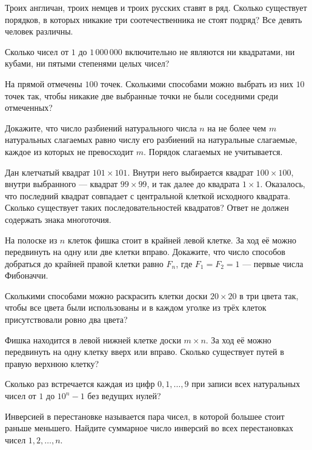 \begin{problems}
\item Троих англичан, троих немцев и троих русских ставят в ряд. Сколько существует порядков, в которых никакие три соотечественника не стоят подряд? Все девять человек различны.

\item Сколько чисел от $1$ до $1\,000\,000$ включительно не являются ни квадратами, ни кубами, ни пятыми степенями целых чисел?

\item На прямой отмечены $100$ точек. Сколькими способами можно выбрать из них $10$ точек так, чтобы никакие две выбранные точки не были соседними среди отмеченных?

\item Докажите, что число разбиений натурального числа $n$ на не более чем $m$ натуральных слагаемых равно числу его разбиений на натуральные слагаемые, каждое из которых не превосходит $m$. Порядок слагаемых не учитывается.

\item Дан клетчатый квадрат $101\times101$. Внутри него выбирается квадрат $100\times100$, внутри выбранного --- квадрат $99\times99$, и так далее до квадрата $1\times1$. Оказалось, что последний квадрат совпадает с центральной клеткой исходного квадрата. Сколько существует таких последовательностей квадратов? Ответ не должен содержать знака многоточия.

\item На полоске из $n$ клеток фишка стоит в крайней левой клетке. За ход её можно передвинуть на одну или две клетки вправо. Докажите, что число способов добраться до крайней правой клетки равно $F_n$, где $F_1=F_2=1$ --- первые числа Фибоначчи.

\item Сколькими способами можно раскрасить клетки доски $20\times20$ в три цвета так, чтобы все цвета были использованы и в каждом уголке из трёх клеток присутствовали ровно два цвета?

\item Фишка находится в левой нижней клетке доски $m\times n$. За ход её можно передвинуть на одну клетку вверх или вправо. Сколько существует путей в правую верхнюю клетку?

\item Сколько раз встречается каждая из цифр $0,1,\ldots,9$ при записи всех натуральных чисел от $1$ до $10^n-1$ без ведущих нулей?

\item Инверсией в перестановке называется пара чисел, в которой большее стоит раньше меньшего. Найдите суммарное число инверсий во всех перестановках чисел $1,2,\ldots,n$.

\end{problems}

